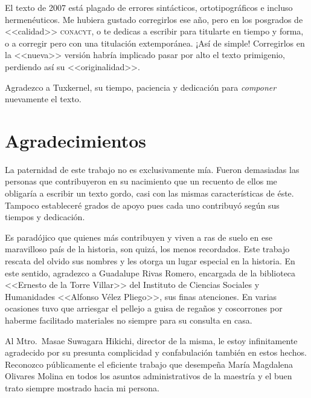 \documentclass[14pt,twoside,final]{extbook} %
\begin{document}
El texto de 2007 está plagado de errores sintácticos, ortotipográficos e incluso hermenéuticos. Me hubiera gustado corregirlos ese año, pero en los posgrados de <<calidad>> \textsc{conacyt}, o te dedicas a escribir para titularte en tiempo y forma, o a corregir pero con una titulación extemporánea. ¡Así de simple! Corregirlos en la <<nueva>> versión habría implicado pasar por alto el texto primigenio, perdiendo así su <<originalidad>>.

Agradezco a Tuxkernel, su tiempo, paciencia y dedicación para \emph{componer} nuevamente el texto.
\chapter*{Agradecimientos}\label{ch:agradecimientos}
\thispagestyle{empty}
\pagestyle{fancy}
\fancyhf{} %
\fancyhead[LE,RO]{\thepage}
\renewcommand{\headrulewidth}{0pt}
\setcounter{page}{7}
La paternidad de este trabajo no es exclusivamente mía. Fueron demasiadas las personas que contribuyeron en su nacimiento que un recuento de ellos me obligaría a escribir un texto gordo, casi con las mismas características de éste. Tampoco estableceré grados de apoyo pues cada uno contribuyó según sus tiempos y dedicación.

Es paradójico que quienes más contribuyen y viven a ras de suelo en ese maravilloso país de la historia, son quizá, los menos recordados. Este trabajo rescata del olvido sus nombres y les otorga un lugar especial en la historia. En este sentido, agradezco a Guadalupe Rivas Romero, encargada de la biblioteca <<Ernesto de la Torre Villar>> del Instituto de Ciencias Sociales y Humanidades <<Alfonso Vélez Pliego>>, sus finas atenciones. En varias ocasiones tuvo que arriesgar el pellejo a guisa de regaños y coscorrones por haberme facilitado materiales no siempre para su consulta en casa.

Al Mtro.~Masae Suwagara Hikichi, director de la misma, le estoy infinitamente agradecido por su presunta complicidad y confabulación también en estos hechos. Reconozco públicamente el eficiente trabajo que desempeña María Magdalena Olivares Molina en todos los asuntos administrativos de la maestría y el buen trato siempre mostrado hacia mi persona.
\end{document}
